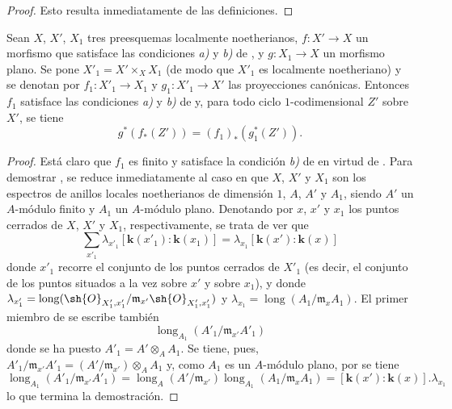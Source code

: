 \begin{proof}
Esto resulta inmediatamente de las definiciones.
\end{proof}

\begin{proposition}[21.10.16]
\label{IV.21.10.16}
Sean $X$, $X'$, $X_1$ tres preesquemas localmente noetherianos, $f:X'\to X$ un morfismo que satisface las condiciones \emph{a)} y \emph{b)} de , y $g:X_1\to X$ un morfismo plano.
Se pone $X'_1=X'\times_XX_1$ (de modo que $X'_1$ es localmente noetheriano) y se denotan por $f_1:X'_1\to X_1$ y $g_1:X'_1\to X'$ las proyecciones canónicas.
Entonces $f_1$ satisface las condiciones \emph{a)} y \emph{b)} de  y, para todo ciclo $1$-codimensional $Z'$ sobre $X'$, se tiene
\[
\label{IV.21.10.16.1}
  g^*(f_*(Z'))=(f_1)_*(g_1^*(Z')).
  \tag{21.10.16.1}
\]
\end{proposition}

\begin{proof}
Está claro que $f_1$ es finito y satisface la condición \emph{b)} de  en virtud de .
Para demostrar , se reduce inmediatamente al caso en que $X$, $X'$ y $X_1$ son los espectros de anillos locales noetherianos de dimensión $1$, $A$, $A'$ y $A_1$, siendo $A'$ un $A$-módulo finito y $A_1$ un $A$-módulo plano.
Denotando por $x$, $x'$ y $x_1$ los puntos cerrados de $X$, $X'$ y $X_1$, respectivamente, se trata de ver que
\[
\label{IV.21.10.16.2}
  \sum_{x'_1}\lambda_{x'_1}[\boldsymbol{k}(x'_1):\boldsymbol{k}(x_1)]
  =\lambda_{x_1}[\boldsymbol{k}(x'):\boldsymbol{k}(x)]
  \tag{21.10.16.2}
\]
donde $x'_1$ recorre el conjunto de los puntos cerrados de $X'_1$ (es decir, el conjunto de los puntos situados a la vez sobre $x'$ y sobre $x_1$), y donde $\lambda_{x'_1}=\operatorname{long}(\sh{O}_{X'_1,x'_1}/\mathfrak{m}_{x'}\sh{O}_{X'_1,x'_1})$ y $\lambda_{x_1}=\operatorname{long}(A_1/\mathfrak{m}_xA_1)$.
El primer miembro de  se escribe también
\[
  \operatorname{long}_{A_1}(A'_1/\mathfrak{m}_{x'}A'_1)
\]
donde se ha puesto $A'_1=A'\otimes_AA_1$.
Se tiene, pues, $A'_1/\mathfrak{m}_{x'}A'_1=(A'/\mathfrak{m}_{x'})\otimes_AA_1$ y, como $A_1$ es un $A$-módulo plano, por  se tiene
\[
  \operatorname{long}_{A_1}(A'_1/\mathfrak{m}_{x'}A'_1)
  =\operatorname{long}_{A}(A'/\mathfrak{m}_{x'})\operatorname{long}_{A_1}(A_1/\mathfrak{m}_xA_1)
  =[\boldsymbol{k}(x'): \boldsymbol{k}(x)].\lambda_{x_1}
\]
lo que termina la demostración.
\end{proof}

